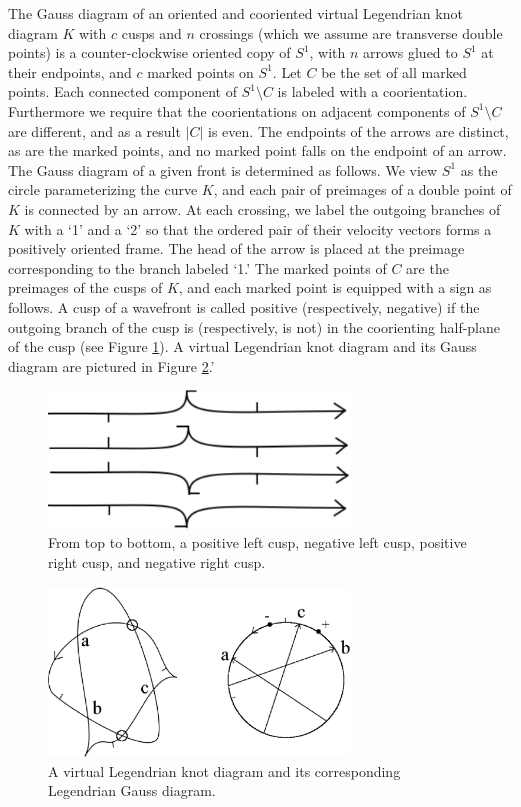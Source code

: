 The Gauss diagram of an oriented and cooriented virtual Legendrian knot diagram $K$ with $c$ cusps and $n$ crossings (which we assume are transverse double points) is a counter-clockwise oriented copy of $S^1$, with $n$ arrows glued to $S^1$ at their endpoints, and $c$ marked points on $S^1$.  Let $C$ be the set of all marked points.  Each connected component of $S^1\setminus C$ is labeled with a coorientation.  Furthermore we require that the coorientations on adjacent components of $S^1\setminus C$ are different, and as a result $|C|$ is even.  The endpoints of the arrows are distinct, as are the marked points, and no marked point falls on the endpoint of an arrow.  The Gauss diagram of a given front is determined as follows.  We view $S^1$ as the circle parameterizing the curve $K$, and each pair of preimages of a double point of $K$ is connected by an arrow.  At each crossing, we label the outgoing branches of $K$ with a `1' and a `2' so that the ordered pair of their velocity vectors forms a positively oriented frame.  The head of the arrow is placed at the preimage corresponding to the branch labeled `1.'  The marked points of $C$ are the preimages of the cusps of $K$, and each marked point is equipped with a sign as follows.  A cusp of a wavefront is called positive (respectively, negative) if the outgoing branch of the cusp is (respectively, is not) in the coorienting half-plane of the cusp (see Figure \ref{cusps.fig}).  A virtual Legendrian knot diagram and its Gauss diagram are pictured in Figure \ref{Gaussdiagram.fig}.'

\begin{figure}[htbp]
	\includegraphics[width=8cm]{goodcusps}
	\caption{From top to bottom, a positive left cusp, negative left cusp, positive right cusp, and negative right cusp.}
	\label{cusps.fig}
\end{figure}

\begin{figure}[htbp]
	\includegraphics[width=8cm]{Gaussdiagram}
	\caption{A virtual Legendrian knot diagram and its corresponding Legendrian Gauss diagram.}
	\label{Gaussdiagram.fig}
\end{figure}

